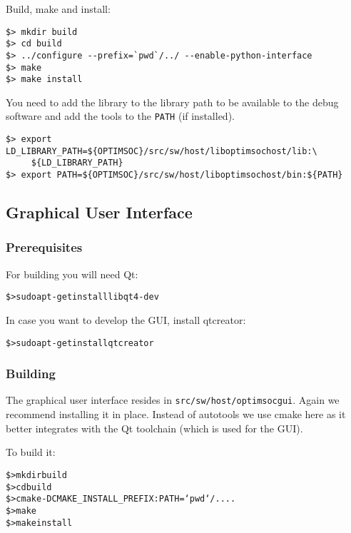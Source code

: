 Build, make and install:

\begin{verbatim}
$> mkdir build
$> cd build
$> ../configure --prefix=`pwd`/../ --enable-python-interface
$> make
$> make install
\end{verbatim}

You need to add the library to the library path to be available to the
debug software and add the tools to the \verb|PATH| (if installed).


\begin{verbatim}
$> export LD_LIBRARY_PATH=${OPTIMSOC}/src/sw/host/liboptimsochost/lib:\
     ${LD_LIBRARY_PATH}
$> export PATH=${OPTIMSOC}/src/sw/host/liboptimsochost/bin:${PATH}
\end{verbatim}

\subsection{Graphical User Interface}

\subsubsection{Prerequisites}

For building you will need Qt:

\begin{alltt}
\$> sudo apt-get install libqt4-dev
\end{alltt}

In case you want to develop the GUI, install qtcreator:

\begin{alltt}
\$> sudo apt-get install qtcreator
\end{alltt}

\subsubsection{Building}

The graphical user interface resides in
\verb|src/sw/host/optimsocgui|. Again we recommend installing it in
place. Instead of autotools we use cmake here as it better integrates
with the Qt toolchain (which is used for the GUI).

To build it:

\begin{alltt}
\$> mkdir build
\$> cd build
\$> cmake -DCMAKE_INSTALL_PREFIX:PATH=`pwd`/.. ..
\$> make
\$> make install
\end{alltt}

